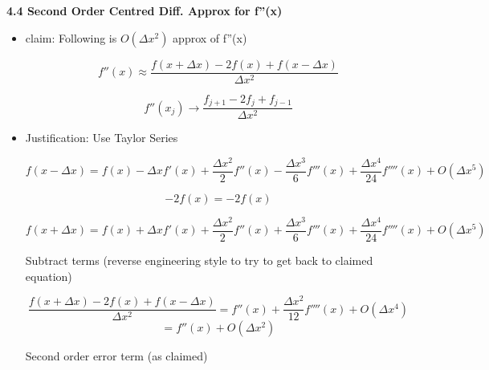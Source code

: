 \textbf{4.4 Second Order Centred Diff. Approx for f''(x)}

\begin{itemize}
    \item claim: Following is $O(\Delta x^2)$ approx of f''(x)

    \[ f''(x) \approx \frac{f(x+\Delta x) - 2f(x) + f(x-\Delta x)}{\Delta x^2}\]

    \begin{equation}
        f''(x_j) \rightarrow \frac{f_{j+1}-2 f_j + f_{j-1}}{\Delta x^2}
    \end{equation}

    \item Justification: Use Taylor Series

    \[f(x-\Delta x) = f(x) - \Delta x f'(x) + \frac{\Delta x^2}{2} f''(x) - \frac{\Delta x^3}{6} f'''(x) + \frac{\Delta x^4}{24} f''''(x) + O (\Delta x^5)\]

    \[-2f(x) = -2 f(x)\]

    \[ f(x+\Delta x) = f(x) + \Delta x f'(x) + \frac{\Delta x^2}{2} f''(x) + \frac{\Delta x^3}{6} f'''(x) + \frac{\Delta x^4}{24} f''''(x) + O(\Delta x^5)\]

    Subtract terms (reverse engineering style to try to get back to claimed equation)

    \[\frac{f(x+\Delta x) - 2f(x) + f(x-\Delta x)}{\Delta x^2} = f''(x) + \frac{\Delta x^2}{12} f''''(x) + O(\Delta x^4) \]
    \[ = f''(x) + O(\Delta x^2)\]

    Second order error term (as claimed)
    
\end{itemize}


